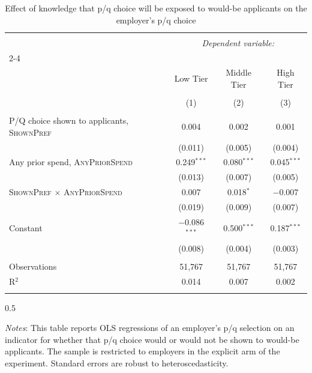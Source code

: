
\begin{table}[!htbp] \centering 
  \caption{Effect of knowledge that p/q choice will be exposed to would-be applicants on the employer's p/q choice} 
  \label{tab:revelation} 
\small 
\begin{tabular}{@{\extracolsep{5pt}}lccc} 
\\[-1.8ex]\hline 
\hline \\[-1.8ex] 
 & \multicolumn{3}{c}{\textit{Dependent variable:}} \\ 
\cline{2-4} 
\\[-1.8ex] & Low Tier & Middle Tier & High Tier \\ 
\\[-1.8ex] & (1) & (2) & (3)\\ 
\hline \\[-1.8ex] 
 P/Q choice shown to applicants, \textsc{ShownPref} & 0.004 & 0.002 & 0.001 \\ 
  & (0.011) & (0.005) & (0.004) \\ 
  Any prior spend, \textsc{AnyPriorSpend} & 0.249$^{***}$ & 0.080$^{***}$ & 0.045$^{***}$ \\ 
  & (0.013) & (0.007) & (0.005) \\ 
  \textsc{ShownPref} $\times$ \textsc{AnyPriorSpend} & 0.007 & 0.018$^{*}$ & $-$0.007 \\ 
  & (0.019) & (0.009) & (0.007) \\ 
  Constant & $-$0.086$^{***}$ & 0.500$^{***}$ & 0.187$^{***}$ \\ 
  & (0.008) & (0.004) & (0.003) \\ 
 \hline \\[-1.8ex] 
Observations & 51,767 & 51,767 & 51,767 \\ 
R$^{2}$ & 0.014 & 0.007 & 0.002 \\ 
\hline 
\hline \\[-1.8ex] 
\end{tabular}

\begin{minipage}{\textwidth}
\begin{spacing}{0.5}
\begin{small}
\emph{Notes}: This table reports OLS regressions of an employer's p/q selection on an indicator for whether that p/q choice would or would not be shown to would-be applicants.
 The sample is restricted to employers in the explicit arm of the experiment.
 Standard errors are robust to heteroscedasticity. 
 \starlanguage
\end{small}
\end{spacing}
\end{minipage}
\end{table}
